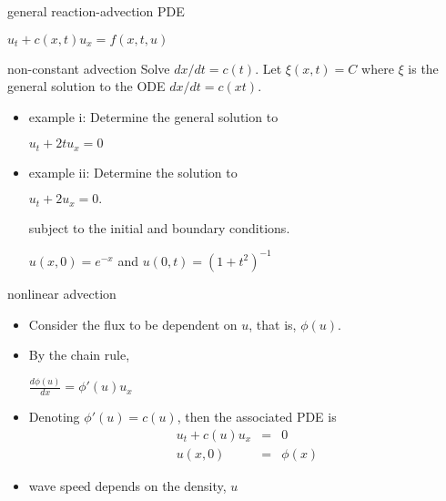 \documentclass[t,10pt,fleqn]{beamer}
\def\ds{\displaystyle}
\begin{document}
\begin{frame}

\begin{block}{general reaction-advection PDE}

\begin{center}
         $u_t + c(x,t) u_x  =  f(x,t,u) $
  \end{center}
  
\end{block}

\pause

\begin{block}{non-constant advection}
  Solve $dx/dt = c(t)$.  Let $\xi(x,t) =C$ where $\xi$ is the general solution to the ODE $dx/dt = c(xt)$.  \pause

\begin{itemize}
\item example i: Determine the general solution to
   \begin{center}
          $u_t+2tu_x=0$
  \end{center}

\item example ii:
 Determine the solution to 
  \begin{center}
          $u_t+2u_x=0.$
  \end{center}
  subject to the initial and boundary conditions.  
  \begin{center}
          $u(x,0)=e^{-x}$ and $u(0,t)= (1+t^2)^{-1}$
  \end{center}  
  
\end{itemize}

\end{block}


\end{frame}
\begin{frame}

\begin{block}{nonlinear advection}

       \begin{itemize}
       \pause
       \item Consider the flux to be dependent on $u$,  that is, $\phi(u)$.
       \pause
       \item By the chain rule,
         \begin{center}
          $\ds \frac{ d \phi(u) }{dx} = \phi'(u) u_x $
        \end{center}
       \pause
       \item Denoting $\phi'(u) = c(u)$, then the associated PDE is
           \begin{eqnarray*}
           u_t + c(u) u_x & = & 0 \\
                             u(x,0) & = & \phi(x)
        \end{eqnarray*}
       \pause
       \item wave speed depends on the density, $u$        
       \end{itemize}
\end{block}
\end{frame}
\end{document}
